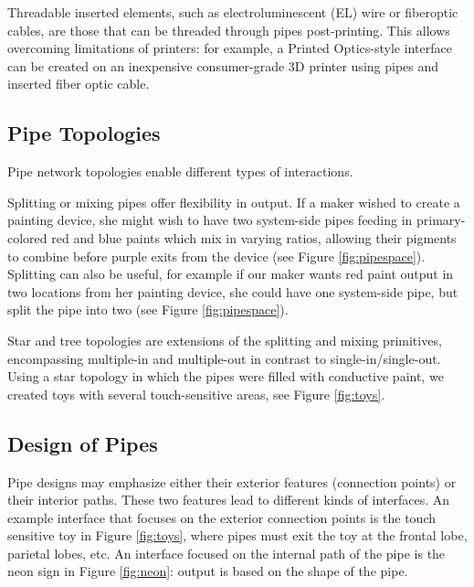Threadable inserted elements, such as electroluminescent (EL) wire or fiberoptic cables, are those that can be threaded through pipes post-printing.  This allows overcoming limitations of printers: for example, a Printed Optics-style interface can be created on an inexpensive consumer-grade 3D printer using pipes and inserted fiber optic cable.

\subsection{Pipe Topologies}

Pipe network topologies enable different types of interactions.

Splitting or mixing pipes offer flexibility in output.  If a maker wished to create a painting device, she might wish to have two system-side pipes feeding in primary-colored red and blue paints which mix in varying ratios, allowing their pigments to combine before purple exits from the device (see Figure \ref{fig:pipespace}).  Splitting can also be useful, for example if our maker wants red paint output in two locations from her painting device, she could have one system-side pipe, but split the pipe into two (see Figure \ref{fig:pipespace}).

Star and tree topologies are extensions of the splitting and mixing primitives, encompassing multiple-in and multiple-out in contrast to single-in/single-out.  Using a star topology in which the pipes were filled with conductive paint, we created toys with several touch-sensitive areas, see Figure \ref{fig:toys}. 

\subsection{Design of Pipes}

Pipe designs may emphasize either their exterior features (connection points) or their interior paths.  These two features lead to different kinds of interfaces.  An example interface that focuses on the exterior connection points is the touch sensitive toy in Figure \ref{fig:toys}, where pipes must exit the toy at the frontal lobe, parietal lobes, etc.  An interface focused on the internal path of the pipe is the neon sign in Figure \ref{fig:neon}: output is based on the shape of the pipe.